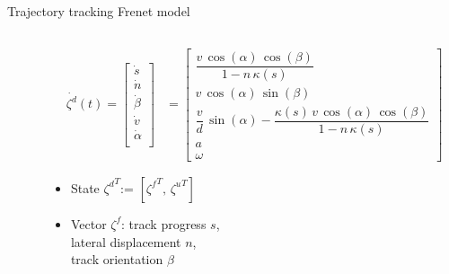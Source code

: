 \documentclass[10pt,aspectratio=1610]{beamer} %
\begin{document}
\begin{frame}{Trajectory tracking Frenet model}
	\begin{columns}[onlytextwidth]
		\begin{column}{0.5\textwidth}
			\begin{center}
			\def\svgwidth{1.0\textwidth}
			
			\end{center}
		\end{column}
		\begin{column}{0.5\textwidth}
		\begin{align*}
			\dot{\zeta^{d}}(t) = \begin{bmatrix}
			\dot{s}\\
			\dot{n}\\
			\dot{\beta}\\
			\dot{v}\\
			\dot{\alpha}\\
		\end{bmatrix} &= 
		\begin{bmatrix}
			\dfrac{v\, \cos(\alpha)\, \cos(\beta)}{1 - n\, \kappa(s)}\\
			v\, \cos(\alpha)\, \sin(\beta)\\
			\dfrac{v}{d}\, \sin(\alpha) - \dfrac{\kappa(s)\, v\, \cos(\alpha)\, \cos(\beta)}{1 - n\, \kappa(s)}\\
			a\\
			\omega 
		\end{bmatrix}
		\end{align*}
		\begin{itemize}[label=\textbullet]
			\item State ${\zeta^{d}}^T$:= $[{\zeta^{f}}^T,\,{\zeta^{u}}^T]$
			\item Vector $\zeta^{f}$: track progress $s$,\\ 
			\hspace{0.62in} lateral displacement $n$,\\ 
			\hspace{0.62in} track orientation $\beta$
		\end{itemize}
		\end{column}
	\end{columns}
\end{frame}
\end{document}
